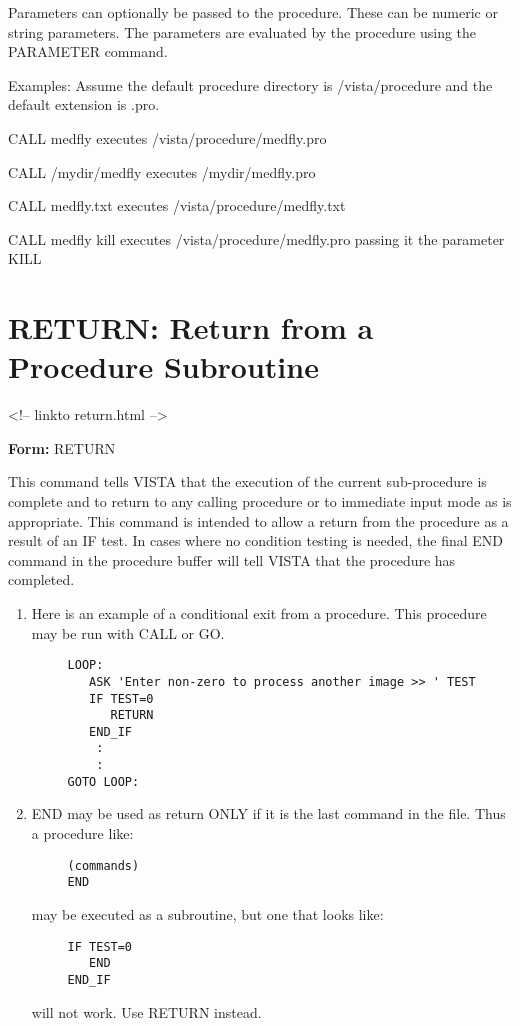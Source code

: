 Parameters can optionally be passed to the procedure.  These can be numeric
or string parameters.  The parameters are evaluated by the procedure using
the PARAMETER command.

Examples:  Assume the default procedure directory is /vista/procedure
and the default extension is .pro.
\begin{example}
  \item[CALL medfly\hfill]{executes /vista/procedure/medfly.pro}
  \item[CALL /mydir/medfly\hfill]{executes /mydir/medfly.pro}
  \item[CALL medfly.txt\hfill]{executes /vista/procedure/medfly.txt}
  \item[CALL medfly kill\hfill]{executes /vista/procedure/medfly.pro
passing it the parameter KILL}
\end{example}

\section{RETURN: Return from a Procedure Subroutine}
\begin{rawhtml}
<!-- linkto return.html -->
\end{rawhtml}

\begin{command}
  \item[\textbf{Form: } RETURN\hfill]{}
\end{command}

This command tells VISTA that the execution of the current sub-procedure is
complete and to return to any calling procedure or to immediate input mode
as is appropriate.  This command is intended to allow a return from the
procedure as a result of an IF test. In cases where no condition testing is
needed, the final END command in the procedure buffer will tell VISTA that
the procedure has completed.

\begin{enumerate}
  \item{Here is an example of a conditional exit from a procedure.
   This procedure may be run with CALL or GO.
  \begin{verbatim}
     LOOP:
        ASK 'Enter non-zero to process another image >> ' TEST
        IF TEST=0
           RETURN
        END_IF
         :
         :
     GOTO LOOP:
  \end{verbatim}
  }
  \item{END may be used as return ONLY if it is the last command in 
  the file. Thus a procedure like:
  \begin{verbatim}
     (commands)
     END
  \end{verbatim}
  may be executed as a subroutine, but one that looks like:
  \begin{verbatim}
     IF TEST=0
        END
     END_IF
  \end{verbatim}
  will not work.  Use RETURN instead.
}
\end{enumerate}


